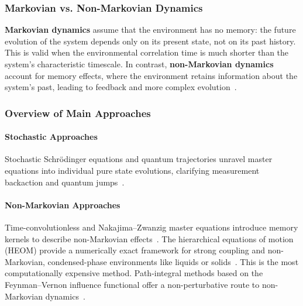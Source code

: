 \subsubsection{Markovian vs. Non-Markovian Dynamics}
\label{subsec:markovian_nonmarkovian}

\noindent
\textbf{Markovian dynamics} assume that the environment has no memory: the future evolution of the system depends only on its present state, not on its past history. This is valid when the environmental correlation time is much shorter than the system's characteristic timescale. In contrast, \textbf{non-Markovian dynamics} account for memory effects, where the environment retains information about the system's past, leading to feedback and more complex evolution~\cite{breuerpetruccione2009theoryopenquantum, rivasetal2014quantumnonmarkovianitycharacterization}.

\subsubsection{Overview of Main Approaches}

\paragraph{Stochastic Approaches}
Stochastic Schrödinger equations and quantum trajectories unravel master equations into individual pure state evolutions, clarifying measurement backaction and quantum jumps~\cite{vogtetal2013stochasticblochredfieldtheory, breuerpetruccione2009theoryopenquantum, carmichael1993opensystemsapproach}.

\paragraph{Non-Markovian Approaches}
Time-convolutionless and Nakajima–Zwanzig master equations introduce memory kernels to describe non-Markovian effects~\cite{breuerpetruccione2009theoryopenquantum, rivasetal2014quantumnonmarkovianitycharacterization}. The hierarchical equations of motion (HEOM) provide a numerically exact framework for strong coupling and non-Markovian, condensed-phase environments like liquids or solids~\cite{tanimura2020numericallyexactapproach}. This is the most computationally expensive method. Path-integral methods based on the Feynman–Vernon influence functional offer a non-perturbative route to non-Markovian dynamics~\cite{weiss2012quantumdissipativesystems}.

